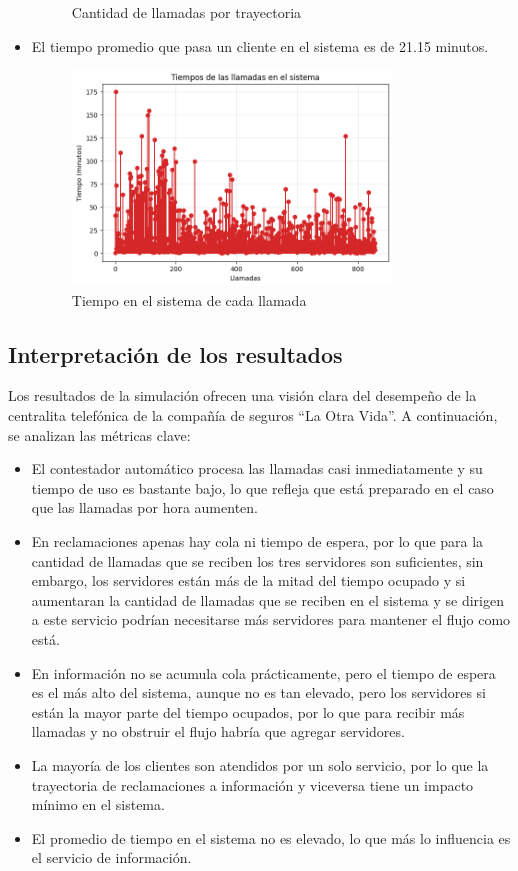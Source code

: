 \documentclass[12pt]{article}
\begin{document}
\begin{itemize}
\begin{figure}[h]
        \caption{Cantidad de llamadas por trayectoria}
        \label{fig: Cantidad de llamadas por trayectoria}
    \end{figure}
    \item El tiempo promedio que pasa un cliente en el sistema es de 21.15 minutos.
    \begin{figure}[h]
        \centering
        \includegraphics[width=0.8\textwidth]{time.png}
        \caption{Tiempo en el sistema de cada llamada}
        \label{fig: Tiempo en el sistema de cada llamada}
    \end{figure}
\end{itemize}

\subsection{Interpretación de los resultados}
Los resultados de la simulación ofrecen una visión clara del desempeño de la centralita telefónica de la compañía de seguros “La Otra Vida”. A continuación, se analizan las métricas clave:
\begin{itemize}
    \item El contestador automático procesa las llamadas casi inmediatamente y su tiempo de uso es bastante bajo, lo que refleja que está preparado en el caso que las llamadas por hora aumenten.
    \item En reclamaciones apenas hay cola ni tiempo de espera, por lo que para la cantidad de llamadas que se reciben los tres servidores son suficientes, sin embargo, los servidores están más de la mitad del tiempo ocupado y si aumentaran la cantidad de llamadas que se reciben en el sistema y se dirigen a este servicio podrían necesitarse más servidores para mantener el flujo como está.
    \item En información no se acumula cola prácticamente, pero el tiempo de espera es el más alto del sistema, aunque no es tan elevado, pero los servidores si están la mayor parte del tiempo ocupados, por lo que para recibir más llamadas y no obstruir el flujo habría que agregar servidores.
    \item La mayoría de los clientes son atendidos por un solo servicio, por lo que la trayectoria de reclamaciones a información y viceversa tiene un impacto mínimo en el sistema.
    \item El promedio de tiempo en el sistema no es elevado, lo que más lo influencia es el servicio de información.
\end{itemize}
\end{document}

